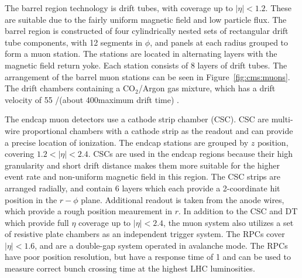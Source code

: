 The barrel region technology is drift tubes, with coverage up to $|\eta| < 1.2$. These are suitable due to the fairly uniform magnetic field and low particle flux. The barrel region is constructed of four cylindrically nested sets of rectangular drift tube components, with 12 segments in $\phi$, and panels at each radius grouped to form a muon station. The stations are located in alternating layers with the magnetic field return yoke. Each station consists of 8 layers of drift tubes. The arrangement of the barrel muon stations can be seen in Figure~\ref{fig:cms:muons}. The drift chambers containing a $\mathrm{CO_2}$/Argon gas mixture, which has a drift velocity of 55 \um/\ns (about 400\ns maximum drift time) \cite{Chatrchyan:2013sba}.



The endcap muon detectors use a cathode strip chamber (CSC). CSC are multi-wire proportional chambers with a cathode strip as the readout and can provide a precise location of ionization. The endcap stations are grouped by $z$ position, covering $1.2 < |\eta| < 2.4$. CSCs are used in the endcap regions because their high granularity and short drift distance makes them more suitable for the higher event rate and non-uniform magnetic field in this region. The CSC strips are arranged radially, and contain 6 layers which each provide a 2-coordinate hit position in the $r-\phi$ plane. Additional readout is taken from the anode wires, which provide a rough position meaurement in $r$.
In addition to the CSC and DT which provide full $\eta$ coverage up to $|\eta| < 2.4$, the muon system also utilizes a set of resistive plate chambers as an independent trigger system. The RPCs cover $|\eta| < 1.6$, and are a double-gap system operated in avalanche mode. The RPCs have poor position resolution, but have a response time of 1 \ns and can be used to measure correct bunch crossing time at the highest LHC luminosities. 
